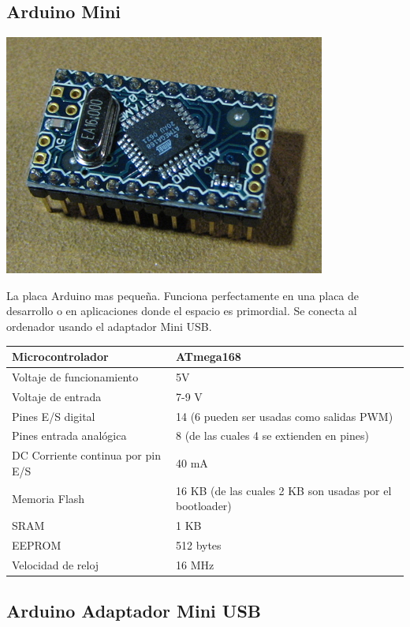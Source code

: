 \documentclass[12pt,a4paper]{report}
\begin{document}
\subsection{Arduino Mini}

\includegraphics[scale=0.6]{arduino_mini.jpg}

La placa Arduino mas pequeña. Funciona perfectamente en una placa de desarrollo
o en aplicaciones donde el espacio es primordial. Se conecta al ordenador usando
el adaptador Mini USB. 

\begin{tabular}{||l | l ||}
\hline
\hline
Microcontrolador & ATmega168\\
\hline
Voltaje de funcionamiento & 5V\\
\hline
Voltaje de entrada & 7-9 V\\
\hline
Pines E/S digital & 14 (6 pueden ser usadas como salidas PWM)\\
\hline
Pines entrada analógica & 8 (de las cuales 4 se extienden en pines)\\
\hline
DC Corriente continua por pin E/S & 40 mA\\
\hline
Memoria Flash & 16 KB (de las cuales 2 KB son usadas por el bootloader)\\
\hline
SRAM & 1 KB\\
\hline
EEPROM & 512 bytes\\
\hline
Velocidad de reloj & 16 MHz\\
\hline
\hline
\end{tabular}

\subsection{Arduino Adaptador Mini USB}
\end{document}
